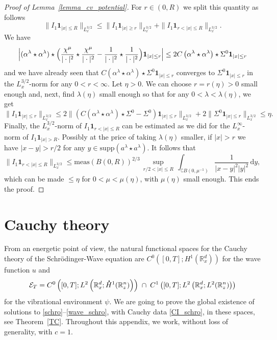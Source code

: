 \documentclass[JEP,XML,SOM,NoEqCountersInSection,NoFloatCountersInSection,Unicode,published]{cedram}
\theoremstyle{definition}
\newcommand*{\overbigdot}[1]{%
\accentset{\mbox{\large\bfseries .}}{#1}}
\newenvironment{ProofOf}[1]{\begin{proof}[Proof of #1]}{\end{proof}}
\newcommand{\R}{\mathbb{R}}
\newcommand{\ud}{\, {\mathrm{d}}}
\begin{document}
\begin{ProofOf}{Lemma~\ref{lemma_cv_potential}}
For $r\in(0,R)$ we split this quantity as follows
\[
\|I_{1}\mathbf{1}_{|x|\leq R}\|_{L_{x}^{3/2}}\leq\|I_{1}\mathbf{1}_{|x|\geq r}\|_{L_{x}^{3/2}}+\|I_{1}\mathbf{1}_{r<|x|\leq R}\|_{L_{x}^{3/2}}.
\]
We have
\[
\Bigl |(\alpha^{\lambda}\star\alpha^{\lambda})\star \Bigl(\frac{\chi^{\mu}}{|\cdot|^{2}}\star\frac{\chi^{\mu}}{|\cdot|^{2}}-\frac{1}{|\cdot|^{2}}\star\frac{1}{|\cdot|^{2}} \Bigr)\mathbf{1}_{|x|\leq r} \Bigr|\leq 2C\left(\alpha^{\lambda}\star\alpha^{\lambda}\right)\star\Sigma^{0}\mathbf{1}_{|x|\leq r}
\]
and we have already seen that $C(\alpha^{\lambda}\star\alpha^{\lambda})\star\Sigma^{0}\mathbf{1}_{|x|\leq r}$ converges to $\Sigma^{0}\mathbf{1}_{|x|\leq r}$ in the $L_{x}^{3/2}$-norm for any $0<r<\infty$.
Let $\eta>0$. We can choose $r=r(\eta)>0$ small enough and, next, find $\lambda(\eta)$ small enough so that for any $0<\lambda<\lambda(\eta)$, we get
\[
\|I_{1}\mathbf{1}_{|x|\leq r}\|_{L_{x}^{3/2}}\leq 2\|(C(\alpha^{\lambda}\star\alpha^{\lambda})\star\Sigma^{0}-\Sigma^{0})\mathbf{1}_{|x|\leq r}\|_{L_{x}^{3/2}}+2\|\Sigma^{0}\mathbf{1}_{|x|\leq r}\|_{L_{x}^{3/2}}
\leq \eta.
\]
Finally, the $L_{x}^{3/2}$-norm of $I_{1}\mathbf{1}_{r<|x|\leq R}$ can be estimated as we did for the $L_{x}^{\infty}$-norm of $I_{1}\mathbf{1}_{|x|>R}$.
Possibly at the price of taking $\lambda(\eta)$ smaller,
if $|x|>r$ we have $|x-y|>r/2$ for any $y\in \mathrm{supp}(a^\lambda\star a^\lambda)$. It follows that
\[
\|I_{1}\mathbf{1}_{r<|x|\leq R}\|_{L_{x}^{3/2}}\leq\mathrm{meas}\left(B(0,R)\right)^{2/3}\,\underset{r/2<|x|\leq R}{\sup}\,\int_{\complement B(0,\mu^{-1})}\frac{1}{|x-y|^{2}|y|^{2}}\ud y,
\]
which can be made $\leq \eta$ for $0<\mu<\mu(\eta)$, with $\mu(\eta)$ small enough.
This ends the proof.
\end{ProofOf}

\appendix
\section{Cauchy theory}\label{CauchyTheory}

From an energetic point of view, the natural functional spaces for the Cauchy theory of the Schrödinger-Wave equation are $C^{0}([0,T];H^{1}(\R_{x}^{d}))$ for the wave function $u$ and
\[
\mathcal{E}_{T}=C^{0}\left([0,T];L^{2}\left(\R_{x}^{d};\overbigdot{H}^{1}(\R_{z}^{n})\right)\right)\;\cap\;C^{1}\left([0,T];L^{2}\left(\R_{x}^{d};L^{2}(\R_{z}^{n})\right)\right)
\]
for the vibrational environment $\psi$.
We are going to prove the global existence of solutions to \eqref{schro}--\eqref{wave_schro}, with Cauchy data \eqref{CI_schro},
in these spaces, see Theorem~\ref{TC}.
Throughout this appendix, we work, without loss of generality, with $c=1$.
\end{document}
